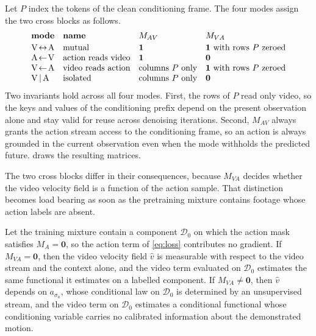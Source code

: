 Let $P$ index the tokens of the clean conditioning frame. The four modes assign
the two cross blocks as follows.
\begin{equation}
  \begin{array}{llll}
    \textbf{mode} & \textbf{name} & M_{AV} & M_{VA} \\[2pt]
    \mathrm{V}\!\leftrightarrow\!\mathrm{A}  & \text{mutual}            & \mathbf{1}                & \mathbf{1} \text{ with rows } P \text{ zeroed} \\
    \mathrm{A}\!\leftarrow\!\mathrm{V}   & \text{action reads video}& \mathbf{1}                & \mathbf{0} \\
    \mathrm{V}\!\leftarrow\!\mathrm{A}   & \text{video reads action}& \text{columns } P \text{ only} & \mathbf{1} \text{ with rows } P \text{ zeroed} \\
    \mathrm{V}\,|\,\mathrm{A}  & \text{isolated}          & \text{columns } P \text{ only} & \mathbf{0}
  \end{array}
  \label{eq:modes}
\end{equation}
Two invariants hold across all four modes. First, the rows of $P$ read only
video, so the keys and values of the conditioning prefix depend on the present
observation alone and stay valid for reuse across denoising iterations. Second,
$M_{AV}$ always grants the action stream access to the conditioning frame, so an
action is always grounded in the current observation even when the mode withholds
the predicted future.  draws the resulting matrices.

The two cross blocks differ in their consequences, because $M_{VA}$ decides
whether the video velocity field is a function of the action sample. That distinction becomes load bearing as soon as the pretraining mixture
contains footage whose action labels are absent.

\begin{proposition}
\label{prop:actionfree}
Let the training mixture contain a component $\mathcal{D}_0$ on which the action
mask satisfies $M_A = \mathbf{0}$, so the action term of \eqref{eq:loss}
contributes no gradient. If $M_{VA} = \mathbf{0}$, then the video velocity field
$\hat{v}$ is measurable with respect to the video stream and the context alone,
and the video term evaluated on $\mathcal{D}_0$ estimates the same functional it
estimates on a labelled component. If $M_{VA} \neq \mathbf{0}$, then $\hat{v}$
depends on $a_{\sigma_a}$, whose conditional law on $\mathcal{D}_0$ is determined
by an unsupervised stream, and the video term on $\mathcal{D}_0$ estimates a
conditional functional whose conditioning variable carries no calibrated
information about the demonstrated motion.
\end{proposition}

